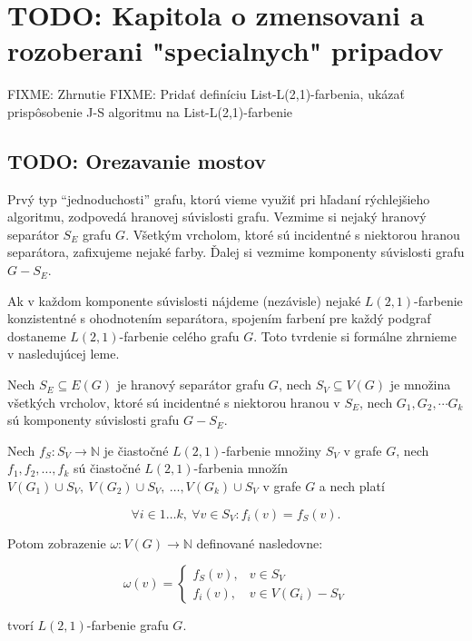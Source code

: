 \chapter{TODO: Kapitola o zmensovani a rozoberani "specialnych" pripadov}

FIXME: Zhrnutie
FIXME: Pridať definíciu List-L(2,1)-farbenia, ukázať prispôsobenie J-S algoritmu na List-L(2,1)-farbenie
\section{TODO: Orezavanie mostov}


Prvý typ ``jednoduchosti'' grafu, ktorú vieme využiť pri hľadaní rýchlejšieho algoritmu,
zodpovedá hranovej súvislosti grafu. Vezmime si nejaký hranový separátor $S_E$ grafu $G$. 
Všetkým vrcholom, ktoré sú incidentné s niektorou hranou separátora, zafixujeme nejaké farby.
Ďalej si vezmime komponenty súvislosti grafu $G - S_E$.

Ak v každom komponente súvislosti nájdeme (nezávisle) nejaké $L(2,1)$-farbenie
konzistentné s ohodnotením separátora, spojením farbení pre každý podgraf dostaneme
$L(2,1)$-farbenie celého grafu $G$. Toto tvrdenie si formálne zhrnieme v nasledujúcej leme.

\begin{lema}
    Nech $S_E \subseteq E(G)$ je hranový separátor grafu $G$,
    nech $S_V \subseteq V(G)$ je množina všetkých vrcholov, ktoré sú incidentné s niektorou hranou
    v $S_E$, nech $G_1, G_2, \cdots G_k$ sú komponenty súvislosti grafu $G - S_E$.

    Nech $f_S: S_V \to \mathbb{N}$ je čiastočné $L(2,1)$-farbenie množiny $S_V$ v grafe $G$,
    nech $f_1, f_2, \ldots, f_k$ sú čiastočné $L(2,1)$-farbenia množín $V(G_1) \cup S_V,\ 
    V(G_2) \cup S_V,\  \ldots, V(G_k) \cup S_V$ v grafe $G$ a nech platí

    $$ \forall i \in {1 \ldots k},\  \forall v \in S_V: f_i(v) = f_S(v) .$$

    Potom zobrazenie $\omega: V(G) \to \mathbb{N}$ definované nasledovne:

    \[ \omega(v) =
    \begin{cases}
        f_S(v), & v \in S_V \\
        f_i(v), & v \in V(G_i) - S_V
    \end{cases}
    \]

    tvorí $L(2,1)$-farbenie grafu $G$.

\end{lema}

